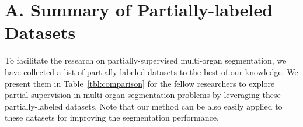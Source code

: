 \documentclass[10pt,twocolumn,letterpaper]{article}
\begin{document}
\section*{A. Summary of Partially-labeled Datasets}
\label{sec:list}
To facilitate the research on partially-supervised multi-organ segmentation, we have collected a list of partially-labeled datasets to the best of our knowledge. We present them in Table~\ref{tbl:comparison} for the fellow researchers to explore partial supervision in multi-organ segmentation problems by leveraging these partially-labeled datasets. Note that our method can be also easily applied to these datasets for improving the segmentation performance.
\begin{table}[h]
\small
\centering
{}
\caption{Summary of partially-labeled datasets for multi-organ segmentation. N denotes the number of annotated cases.}
\label{tbl:comparison}
\end{table}
\end{document}
